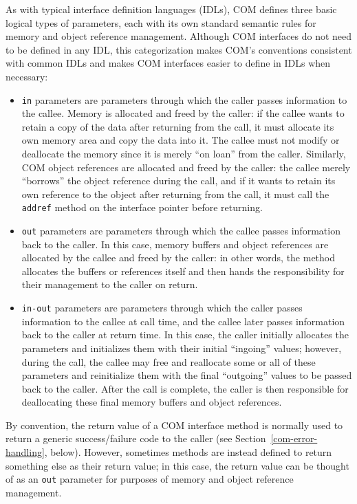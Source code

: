 As with typical interface definition languages (IDLs),
COM defines three basic logical types of parameters,
each with its own standard semantic rules
for memory and object reference management.
Although COM interfaces do not need to be defined in any IDL,
this categorization makes COM's conventions consistent with common IDLs
and makes COM interfaces easier to define in IDLs when necessary:
\begin{itemize}
\item	\texttt{in} parameters
	are parameters through which
	the caller passes information to the callee.
	Memory is allocated and freed by the caller:
	if the callee wants to retain a copy of the data
	after returning from the call,
	it must allocate its own memory area and copy the data into it.
	The callee must not modify or deallocate the memory
	since it is merely ``on loan'' from the caller.
	Similarly, COM object references are allocated and freed by the caller:
	the callee merely ``borrows'' the object reference during the call,
	and if it wants to retain its own reference to the object
	after returning from the call,
	it must call the \texttt{addref} method on the interface pointer
	before returning.
\item	\texttt{out} parameters
	are parameters through which
	the callee passes information back to the caller.
	In this case,
	memory buffers and object references
	are allocated by the callee and freed by the caller:
	in other words, the method allocates the buffers or references itself
	and then hands the responsibility for their management
	to the caller on return.
\item	\texttt{in-out} parameters
	are parameters through which
	the caller passes information to the callee at call time,
	and the callee later passes information back to the caller
	at return time.
	In this case, the caller initially allocates the parameters
	and initializes them with their initial ``ingoing'' values;
	however, during the call,
	the callee may free and reallocate some or all of these parameters
	and reinitialize them with the final ``outgoing'' values
	to be passed back to the caller.
	After the call is complete,
	the caller is then responsible
	for deallocating these final memory buffers and object references.
\end{itemize}

By convention,
the return value of a COM interface method
is normally used to return a generic success/failure code to the caller
(see Section~\ref{com-error-handling}, below).
However, sometimes methods are instead defined
to return something else as their return value;
in this case, the return value can be thought of
as an \texttt{out} parameter
for purposes of memory and object reference management.

